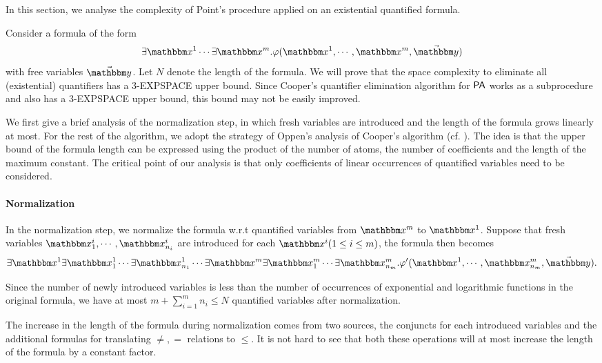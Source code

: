 
In this section, we analyse the complexity of Point's procedure applied on an existential quantified {\paexp} formula. 

Consider a formula of the form $$\exists \ivarx^1\cdots\exists \ivarx^m.\varphi(\ivarx^1,\cdots,\ivarx^m,\vec{\ivary})$$ with free variables $\vec{\ivary}$. Let $N$ denote the length of the formula. We will prove that the space complexity to eliminate all (existential) quantifiers has a 3-EXPSPACE upper bound. Since Cooper's quantifier elimination algorithm for ${\sf PA}$ works as a subprocedure and also has a 3-EXPSPACE upper bound, this bound may not be easily improved.

We first give a brief analysis of the normalization step, in which fresh variables are introduced and the length of the formula grows linearly at most. 
For the rest of the algorithm, we adopt the strategy of Oppen's analysis of Cooper's algorithm (cf. \cite{Oppen73}). The idea is that the upper bound of the formula length can be expressed using the product of the number of atoms, the number of coefficients and the length of the maximum constant. 
The critical point of our analysis is that only coefficients of linear occurrences of quantified variables need to be considered.

\paragraph{Normalization} In the normalization step, we normalize the formula w.r.t quantified variables from $\ivarx^m$ to $\ivarx^1$. Suppose that fresh variables $\ivarx^i_1,\cdots,\ivarx^i_{n_i}$ are introduced for each $\ivarx^i(1\le i\le m)$, the formula then becomes $$\exists \ivarx^1\exists \ivarx^1_1\cdots\exists\ivarx^1_{n_1}\cdots\exists \ivarx^m\exists \ivarx^m_1\cdots\exists\ivarx^m_{n_m}.\varphi'(\ivarx^1,\cdots,\ivarx^m_{n_m},\vec{\ivary}).$$ 

Since the number of newly introduced variables is less than the number of occurrences of exponential and logarithmic functions in the original formula, we have at most $m+\sum_{i=1}^m n_i\le N$ quantified variables after normalization.  

The increase in the length of the formula during normalization comes from two sources, the conjuncts for each introduced variables and the additional formulas for translating $\neq,=$ relations to $\le$. It is not hard to see that both these operations will at most increase the length of the formula by a constant factor. 

